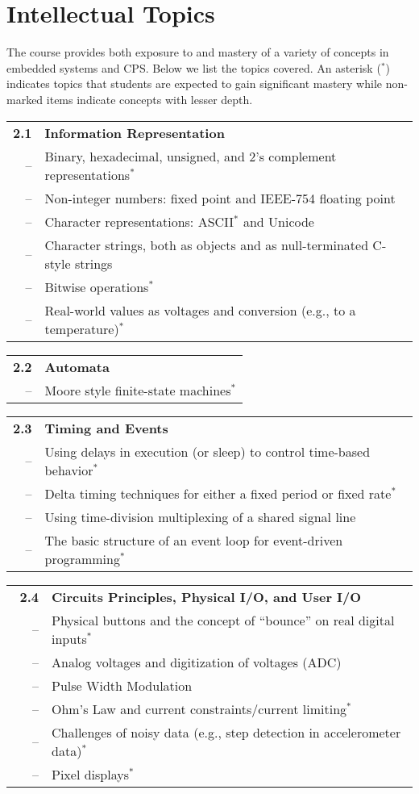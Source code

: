 \section{Intellectual Topics}\label{sec:topics}
The course provides both exposure to and mastery of a variety of concepts
in embedded systems and CPS.  Below we list the topics covered.
An asterisk ($^*$) indicates topics that students are expected to gain significant mastery
while non-marked items indicate concepts with lesser depth.



\noindent
\begin{tabular}{r l}
{\bf 2.1} & {\bf Information Representation} \\
-- & Binary, hexadecimal, unsigned, and 2's complement representations$^*$ \\
-- & Non-integer numbers: fixed point and IEEE-754 floating point \\
-- & Character representations: ASCII$^*$ and Unicode \\
-- & Character strings, both as objects and as null-terminated C-style strings \\
-- &  Bitwise operations$^*$ \\
-- & Real-world values as voltages and conversion (e.g., to a temperature)$^*$
\end{tabular}

\noindent
\begin{tabular}{r l}
{\bf 2.2} & {\bf Automata}\\
-- & Moore style finite-state machines$^*$
\end{tabular}

\noindent
\begin{tabular}{r l}
{\bf 2.3} & {\bf Timing and Events} \\
-- & Using delays in execution (or sleep) to control time-based behavior$^*$ \\
-- & Delta timing techniques for either a fixed period or fixed rate$^*$ \\
-- & Using time-division multiplexing of a shared signal line \\
-- & The basic structure of an event loop for event-driven programming$^*$
\end{tabular}

\noindent
\begin{tabular}{r l}
{\bf 2.4} & {\bf Circuits Principles, Physical I/O, and User I/O} \\
-- & Physical buttons and the concept of ``bounce'' on real digital inputs$^*$ \\
-- & Analog voltages and digitization of voltages (ADC) \\
-- & Pulse Width Modulation \\
-- & Ohm's Law and current constraints/current limiting$^*$ \\
\ \ \ -- & Challenges of noisy data (e.g., step detection in accelerometer data)$^*$ \\
-- & Pixel displays$^*$
\end{tabular}

